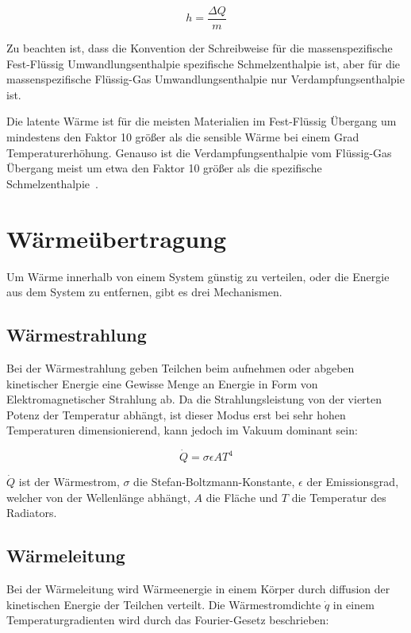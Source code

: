 \begin{equation}
    h = \frac{\Delta Q}{m}
\end{equation}

Zu beachten ist, dass die Konvention der Schreibweise für die massenspezifische Fest-Flüssig Umwandlungsenthalpie spezifische Schmelzenthalpie ist,
aber für die massenspezifische Flüssig-Gas Umwandlungsenthalpie nur Verdampfungsenthalpie ist.

Die latente Wärme ist für die meisten Materialien im Fest-Flüssig Übergang um mindestens den Faktor 10 größer als die sensible Wärme bei
einem Grad Temperaturerhöhung. Genauso ist die Verdampfungsenthalpie vom Flüssig-Gas Übergang meist um etwa den Faktor 10 größer als die 
spezifische Schmelzenthalpie~\cite{fusion-vaporization}.

\section{Wärmeübertragung}\label{sec:waermeuebertragung}

Um Wärme innerhalb von einem System günstig zu verteilen, oder die Energie aus dem System zu entfernen, gibt es drei Mechanismen.

\subsection{Wärmestrahlung}\label{sec:strahlung}

Bei der Wärmestrahlung geben Teilchen beim aufnehmen oder abgeben kinetischer Energie eine Gewisse Menge an Energie in Form
von Elektromagnetischer Strahlung ab. Da die Strahlungsleistung von der vierten Potenz der Temperatur
abhängt, ist dieser Modus erst bei sehr hohen Temperaturen dimensionierend, kann jedoch im Vakuum dominant sein:

\begin{equation}
    \label{eq:radiation}
    \dot{Q}=\sigma\epsilon A T^{4}
\end{equation}

$\dot{Q}$ ist der Wärmestrom, $\sigma$ die Stefan-Boltzmann-Konstante, $\epsilon$ der Emissionsgrad, welcher von der Wellenlänge
abhängt, $A$ die Fläche und $T$ die Temperatur des Radiators.

\subsection{Wärmeleitung}\label{sec:waermeleitung}

Bei der Wärmeleitung wird Wärmeenergie in einem Körper durch diffusion der kinetischen Energie der Teilchen verteilt.
Die Wärmestromdichte $\dot{q}$ in einem Temperaturgradienten wird durch das Fourier-Gesetz beschrieben:

